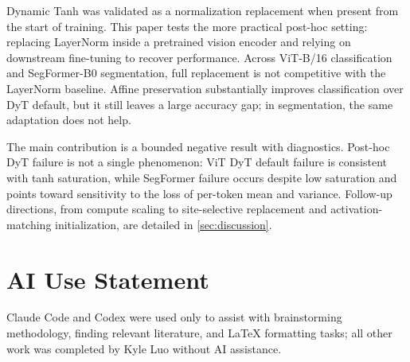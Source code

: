 \documentclass[10pt,twocolumn,letterpaper]{article}
\begin{document}
Dynamic Tanh was validated as a normalization replacement when present from the start of training. This paper tests the more practical post-hoc setting: replacing LayerNorm inside a pretrained vision encoder and relying on downstream fine-tuning to recover performance. Across ViT-B/16 classification and SegFormer-B0 segmentation, full replacement is not competitive with the LayerNorm baseline. Affine preservation substantially improves classification over DyT default, but it still leaves a large accuracy gap; in segmentation, the same adaptation does not help.

The main contribution is a bounded negative result with diagnostics. Post-hoc DyT failure is not a single phenomenon: ViT DyT default failure is consistent with tanh saturation, while SegFormer failure occurs despite low saturation and points toward sensitivity to the loss of per-token mean and variance. Follow-up directions, from compute scaling to site-selective replacement and activation-matching initialization, are detailed in \cref{sec:discussion}.

\section{AI Use Statement}

Claude Code and Codex were used only to assist with brainstorming methodology, finding relevant literature, and LaTeX formatting tasks; all other work was completed by Kyle Luo without AI assistance.

{\small


}
\end{document}
